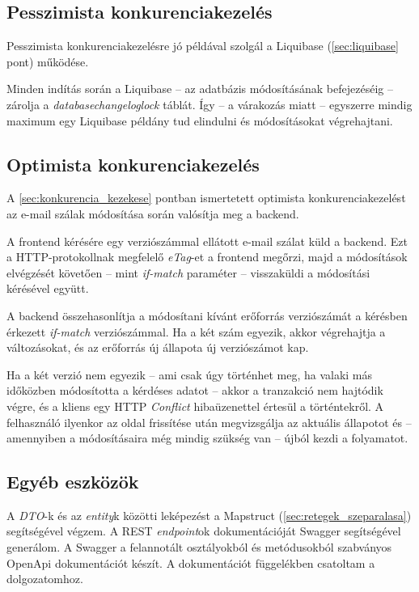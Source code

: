 \subsection{Pesszimista konkurenciakezelés}
Pesszimista konkurenciakezelésre jó példával szolgál a Liquibase (\ref{sec:liquibase} pont) működése. 

Minden indítás során a Liquibase --  az adatbázis módosításának befejezéséig --   zárolja a \textit{databasechangeloglock} táblát. Így --  a várakozás miatt --   egyszerre mindig maximum egy Liquibase példány tud elindulni és módosításokat végrehajtani.


\subsection{Optimista konkurenciakezelés}
A \ref{sec:konkurencia_kezekese} pontban ismertetett optimista konkurenciakezelést az e-mail szálak módosítása során valósítja meg a backend.

A frontend kérésére egy verziószámmal ellátott e-mail szálat küld a backend. Ezt a HTTP-protokollnak megfelelő \textit{eTag}-et a frontend megőrzi, majd a módosítások elvégzését követően --  mint \textit{if-match} paraméter --   visszaküldi a módosítási kérésével együtt.

A backend összehasonlítja a módosítani kívánt erőforrás verziószámát a kérésben érkezett \textit{if-match} verziószámmal. Ha a két szám egyezik, akkor végrehajtja a változásokat, és az erőforrás új állapota új verziószámot kap.

Ha a két verzió nem egyezik --  ami csak úgy történhet meg, ha valaki más időközben módosította a kérdéses adatot --   akkor a tranzakció nem hajtódik végre, és a kliens egy HTTP \textit{Conflict} hibaüzenettel értesül a történtekről. A felhasználó ilyenkor az oldal frissítése után megvizsgálja az aktuális állapotot és --  amennyiben a módosításaira még mindig szükség van --   újból kezdi a folyamatot.

\subsection{Egyéb eszközök}\label{sec:backend_egyeb_eszkozok}
A \textit{DTO}-k és az \textit{entity}k közötti leképezést a Mapstruct (\ref{sec:retegek_szeparalasa}) segítségével végzem. A REST \textit{endpoint}ok dokumentációját Swagger segítségével generálom. A Swagger a felannotált osztályokból és metódusokból szabványos OpenApi dokumentációt készít. A dokumentációt  függelékben csatoltam a dolgozatomhoz.



